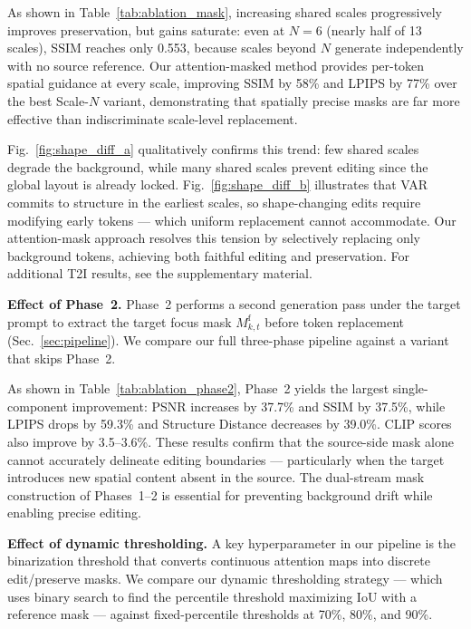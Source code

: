 

As shown in Table~\ref{tab:ablation_mask}, increasing shared scales progressively improves preservation, but gains saturate: even at $N{=}6$ (nearly half of 13 scales), SSIM reaches only 0.553, because scales beyond $N$ generate independently with no source reference. Our attention-masked method provides per-token spatial guidance at every scale, improving SSIM by 58\% and LPIPS by 77\% over the best Scale-$N$ variant, demonstrating that spatially precise masks are far more effective than indiscriminate scale-level replacement.

Fig.~\ref{fig:shape_diff_a} qualitatively confirms this trend: few shared scales degrade the background, while many shared scales prevent editing since the global layout is already locked. Fig.~\ref{fig:shape_diff_b} illustrates that VAR commits to structure in the earliest scales, so shape-changing edits require modifying early tokens — which uniform replacement cannot accommodate. Our attention-mask approach resolves this tension by selectively replacing only background tokens, achieving both faithful editing and preservation. For additional T2I results, see the supplementary material.

\noindent\textbf{Effect of Phase~2.}
Phase~2 performs a second generation pass under the target prompt to extract the target focus mask $M_{k,t}^{\mathrm{f}}$ before token replacement (Sec.~\ref{sec:pipeline}). We compare our full three-phase pipeline against a variant that skips Phase~2.



As shown in Table~\ref{tab:ablation_phase2}, Phase~2 yields the largest single-component improvement: PSNR increases by 37.7\% and SSIM by 37.5\%, while LPIPS drops by 59.3\% and Structure Distance decreases by 39.0\%. CLIP scores also improve by 3.5--3.6\%. These results confirm that the source-side mask alone cannot accurately delineate editing boundaries — particularly when the target introduces new spatial content absent in the source. The dual-stream mask construction of Phases~1--2 is essential for preventing background drift while enabling precise editing.

\noindent\textbf{Effect of dynamic thresholding.}
A key hyperparameter in our pipeline is the binarization threshold that converts continuous attention maps into discrete edit/preserve masks. We compare our dynamic thresholding strategy — which uses binary search to find the percentile threshold maximizing IoU with a reference mask — against fixed-percentile thresholds at 70\%, 80\%, and 90\%.

